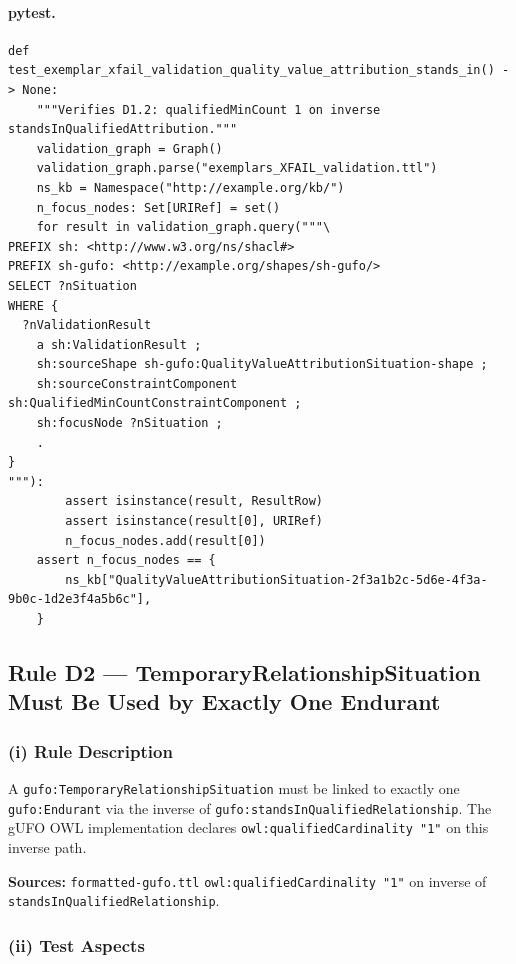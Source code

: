 \documentclass[12pt,a4paper]{article}
\newcommand{\gufoclass}[1]{\nolinkurl{gufo:#1}}
\newcommand{\gufoprop}[1]{\nolinkurl{gufo:#1}}
\begin{document}
\paragraph{pytest.}

\begin{lstlisting}[style=pythonstyle]
def test_exemplar_xfail_validation_quality_value_attribution_stands_in() -> None:
    """Verifies D1.2: qualifiedMinCount 1 on inverse standsInQualifiedAttribution."""
    validation_graph = Graph()
    validation_graph.parse("exemplars_XFAIL_validation.ttl")
    ns_kb = Namespace("http://example.org/kb/")
    n_focus_nodes: Set[URIRef] = set()
    for result in validation_graph.query("""\
PREFIX sh: <http://www.w3.org/ns/shacl#>
PREFIX sh-gufo: <http://example.org/shapes/sh-gufo/>
SELECT ?nSituation
WHERE {
  ?nValidationResult
    a sh:ValidationResult ;
    sh:sourceShape sh-gufo:QualityValueAttributionSituation-shape ;
    sh:sourceConstraintComponent sh:QualifiedMinCountConstraintComponent ;
    sh:focusNode ?nSituation ;
    .
}
"""):
        assert isinstance(result, ResultRow)
        assert isinstance(result[0], URIRef)
        n_focus_nodes.add(result[0])
    assert n_focus_nodes == {
        ns_kb["QualityValueAttributionSituation-2f3a1b2c-5d6e-4f3a-9b0c-1d2e3f4a5b6c"],
    }
\end{lstlisting}

\subsection{Rule D2 --- TemporaryRelationshipSituation Must Be Used by Exactly One Endurant}
\label{sec:rule-d2}

\subsubsection*{(i) Rule Description}

A \gufoclass{TemporaryRelationshipSituation} must be linked to exactly one
\gufoclass{Endurant} via the inverse of \gufoprop{standsInQualifiedRelationship}.
The gUFO OWL implementation declares \nolinkurl{owl:qualifiedCardinality "1"} on
this inverse path.

\textbf{Sources:} \nolinkurl{formatted-gufo.ttl} \nolinkurl{owl:qualifiedCardinality "1"} on inverse of \texttt{standsInQualifiedRelationship}.

\subsubsection*{(ii) Test Aspects}
\end{document}
